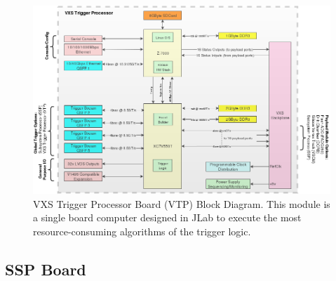 \begin{figure}[hbt]
	\centering
	\includegraphics[width=1.0\columnwidth,keepaspectratio]{img/vtp_block_daq.png}
	\caption{VXS Trigger Processor Board (VTP) Block Diagram. This module is a single board computer designed in JLab to execute the most resource-consuming algorithms of the trigger logic.}
	\label{fig:vtp_block_daq}
\end{figure}


\subsection{SSP Board}
\label{sec:ssp_board}

